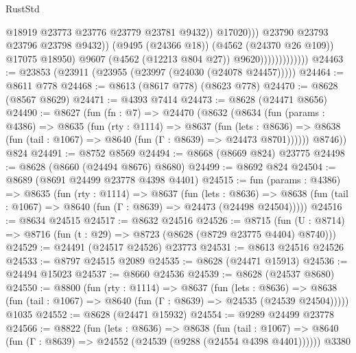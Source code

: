\begin{lexlean}{RustStd}
\begin{coremodule}
                                              @18919
                                              @23773
                                              @23776
                                              @23779
                                              @23781
                                              @9432))
                                          @17020)))
                                    @23790
                                    @23793
                                    @23796
                                    @23798
                                    @9432))
                                (@9495 (@24366 @18))
                                (@4562 (@24370 @26 @109))
                                @17075
                                @18950)
                              @9607
                              (@4562 (@12213 @804 @27))
                              @9620)))))))))))))
@24463 := @23853 (@23911 (@23955 (@23997 (@24030 (@24078 @24457)))))
@24464 := @8611 @778
@24468 := @8613 (@8617 @778) (@8623 @778)
@24470 := @8628 (@8567 @8629)
@24471 := @4393 @7414
@24473 := @8628 (@24471 @8656)
@24490 := @8627
    (fun (fn : @7) =>
    @24470
      (@8632
        (@8634
          (fun (params : @4386) =>
          @8635
            (fun (rty : @1114) =>
            @8637
              (fun (lets : @8636) =>
              @8638 (fun (tail : @1067) => @8640 (fun (Γ : @8639) => @24473 @8701))))))
        @8746))
    @824
@24491 := @8752 @8569
@24494 := @8668 (@8669 @824) @23775
@24498 := @8628 (@8660 (@24494 @8676) @8680)
@24499 := @8692 @824
@24504 := @8689 (@8691 @24499 @23778 @4398 @4401)
@24515 := fun (params : @4386) =>
  @8635
    (fun (rty : @1114) =>
    @8637
      (fun (lets : @8636) =>
      @8638 (fun (tail : @1067) => @8640 (fun (Γ : @8639) => @24473 (@24498 @24504)))))
@24516 := @8634 @24515
@24517 := @8632 @24516
@24526 := @8715
    (fun (U : @8714) => @8716 (fun (t : @29) => @8723 (@8628 (@8729 @23775 @4404) @8740)))
@24529 := @24491 (@24517 @24526) @23773
@24531 := @8613 @24516 @24526
@24533 := @8797 @24515 @2089
@24535 := @8628 (@24471 @15913)
@24536 := @24494 @15023
@24537 := @8660 @24536
@24539 := @8628 (@24537 @8680)
@24550 := @8800
    (fun (rty : @1114) =>
    @8637
      (fun (lets : @8636) =>
      @8638 (fun (tail : @1067) => @8640 (fun (Γ : @8639) => @24535 (@24539 @24504)))))
    @1035
@24552 := @8628 (@24471 @15932)
@24554 := @9289 @24499 @23778
@24566 := @8822
    (fun (lets : @8636) =>
    @8638
      (fun (tail : @1067) =>
      @8640 (fun (Γ : @8639) => @24552 (@24539 (@9288 (@24554 @4398 @4401))))))
    @3380

\end{coremodule}
\end{lexlean}
